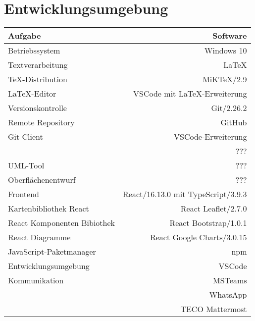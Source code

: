 \section{Entwicklungsumgebung}

\begin{tabular}[htb]{l|r}
    Aufgabe & Software\\
    \hline \hline
    Betriebssystem & Windows 10\\
    \hline
    Textverarbeitung & \LaTeX\\
    TeX-Distribution & MiKTeX/2.9\\
    \LaTeX -Editor & VSCode mit \LaTeX -Erweiterung\\
    \hline
    Versionskontrolle & Git/2.26.2\\
    Remote Repository & GitHub\\
    Git Client & VSCode-Erweiterung\\
    & ???\\
    UML-Tool & ???\\
    Oberflächenentwurf & ???\\
    \hline
    Frontend & React/16.13.0 mit TypeScript/3.9.3\\
    Kartenbibliothek React & React Leaflet/2.7.0\\
    React Komponenten Bibiothek & React Bootstrap/1.0.1\\
    React Diagramme & React Google Charts/3.0.15\\
    JavaScript-Paketmanager & npm\\
    Entwicklungsumgebung & VSCode\\
    \hline
    Kommunikation & MSTeams\\
    & WhatsApp\\
    & TECO Mattermost\\
\end{tabular}    
